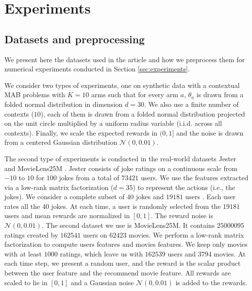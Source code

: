 \section{Experiments}

\subsection{Datasets and preprocessing}\label{app:experiments_setup}

We present here the datasets used in the article and how we preprocess them for numerical experiments conducted in Section \ref{sec:experiments}.

We consider two types of experiments, one on synthetic data with a contextual MAB problems with $K = 10$ arms such that for every arm $a$, $\theta_{a}$ is drawn from a folded normal distribution in dimension $d = 30$. We also use a finite number of contexts ($10$), each of them is drawn from a folded normal distribution projected on the unit circle multiplied by a uniform radius variable (i.i.d. across all contexts). Finally, we scale the expected rewards in $(0,1]$ and the noise is drawn from a centered Gaussian distribution $\mathcal{N}(0, 0.01)$. 

The second type of experiments is conducted in the real-world datasets Jester \cite{goldberg2001eigentaste} and MovieLens25M \cite{harper2015movielens}. Jester consists of joke ratings on a continuous scale from $-10$ to $10$ for $100$ jokes from a total of $73421$ users. We use the features extracted via a low-rank matrix factorization ($d = 35$) to represent the actions (i.e., the jokes). We consider a complete subset of $40$ jokes and $19181$ users . Each user  rates all the $40$ jokes. At each time, a user is randomly selected from the $19181$ users and mean rewards are normalized in $[0, 1]$. The reward noise is $\mathcal{N} (0, 0.01)$. The second dataset we use is MovieLens25M. It contains $25000095$ ratings created by $162541$ users on $62423$ movies. We perform a low-rank matrix factorization to compute users features and movies features. We keep only movies with at least $1000$ ratings, which leave us with $162539$ users and $3794$ movies. At each time step, we present a random user, and the reward is the scalar product between the user feature and the recommend movie feature. All rewards are scaled to lie in $[0,1]$ and a Gaussian noise $\mathcal{N}(0, 0.01)$ is added to the rewards. 


